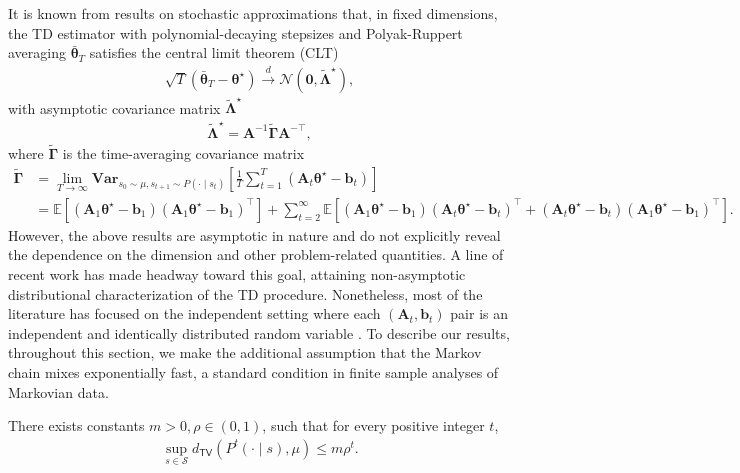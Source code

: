 It is known from results on stochastic approximations that, in fixed dimensions,  the TD estimator with polynomial-decaying stepsizes and Polyak-Ruppert averaging $\bar{\bm{\theta}}_T$ satisfies the central limit theorem (CLT) \citep[see, e.g.,][]{fort2015central,mou2020linear,li2023online}
\begin{align*}
    \sqrt{T}(\bar{\bm{\theta}}_T - \bm{\theta}^\star) \xrightarrow{d} \mathcal{N}(\bm{0},\tilde{\bm{\Lambda}}^\star),
\end{align*}
with asymptotic covariance matrix $\tilde{\bm{\Lambda}}^\star$ 
\begin{align}
    \label{eq:defn-tilde-Lambdastar}
    \tilde{\bm{\Lambda}}^\star = \bm{A}^{-1} \tilde{\bm{\Gamma}}\bm{A}^{-\top},
\end{align}
where $\tilde{\bm{\Gamma}}$ is the time-averaging covariance matrix
\begin{align}
\label{eq:defn-tilde-Gamma}
\tilde{\bm{\Gamma}}&=\lim_{T \to \infty} \mathbf{Var}_{s_0 \sim \mu,s_{t+1} \sim P(\cdot \mid s_t)} \left[\frac{1}{T}\sum_{t=1}^T (\bm{A}_t\bm{\theta}^\star - \bm{b}_t)\right]\nonumber \\ 
&= \mathbb{E}[(\bm{A}_1 \bm{\theta}^\star - \bm{b}_1)(\bm{A}_1 \bm{\theta}^\star - \bm{b}_1)^\top] + \sum_{t=2}^{\infty} \mathbb{E}[(\bm{A}_1 \bm{\theta}^\star - \bm{b}_1)(\bm{A}_{t} \bm{\theta}^\star - \bm{b}_{t})^\top + (\bm{A}_{t} \bm{\theta}^\star - \bm{b}_{t})(\bm{A}_1 \bm{\theta}^\star - \bm{b}_1)^\top].
\end{align}
However, the above results are asymptotic in nature and do not explicitly reveal the dependence on the dimension and other problem-related quantities. A line of recent work has made headway toward this goal, attaining non-asymptotic distributional characterization of the TD procedure. 
Nonetheless, most of the literature has focused on the independent setting where each $(\bm{A}_t,\bm{b}_t)$ pair is an independent and identically distributed random variable \citep[see, e.g.,][]{mou2020linear,wu2024statistical, samsonov2024gaussian}. 
To describe our results, throughout this section, we make the additional assumption that the Markov chain mixes exponentially fast, a standard condition in finite sample analyses of Markovian data. 
\medskip
\begin{customassumption}\label{as:mixing}
There exists constants $m>0,\rho\in (0,1)$, such that for every positive integer $t$,
\begin{align*}
\sup_{s \in \mathcal{S}} d_{\mathsf{TV}}(P^t(\cdot \mid s), \mu) \leq m \rho^t.
\end{align*}
\end{customassumption}
